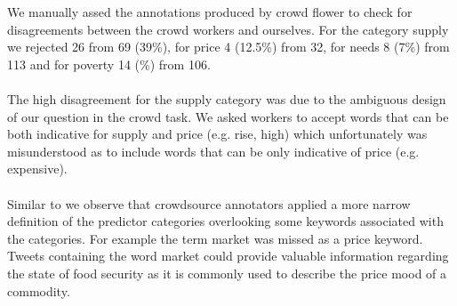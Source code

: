 We manually assed the annotations produced by crowd flower to check for disagreements between the crowd workers and ourselves. For the category supply we rejected 26 from 69 (39\%), for price 4 (12.5\%) from 32, for needs 8 (7\%) from 113 and for poverty 14 (\%) from 106. \\
\\
The high disagreement for the supply category was due to the ambiguous design of our question in the crowd task. We asked workers to accept words that can be both indicative for supply and price (e.g. rise, high) which unfortunately was misunderstood as to include words that can be only indicative of price (e.g. expensive). \\
\\
Similar to \cite{olt15} we observe that crowdsource annotators applied a more narrow definition of the predictor categories overlooking some keywords associated with the categories. For example the term market was missed as a price keyword. Tweets containing the word market could provide valuable information regarding the state of food security as it is commonly used to describe the price  mood of a commodity. \\
\\



